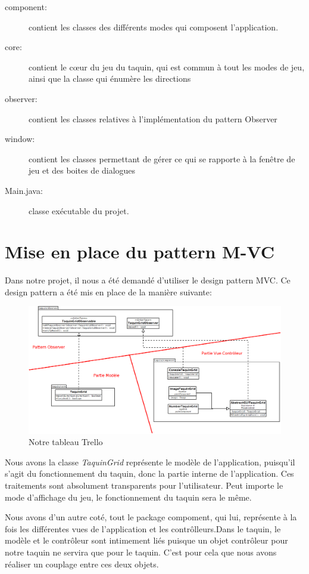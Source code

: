 		\begin{description}
			\item [component:] contient les classes des différents modes qui composent l’application.
			\item [core:] contient le cœur du jeu du taquin, qui est commun à tout les modes de jeu, ainsi que la classe qui énumère les directions
			\item [observer:] contient les classes relatives à l'implémentation du pattern Observer
			\item [window:] contient les classes permettant de gérer ce qui se rapporte à la fenêtre de jeu et des boites de dialogues
			\item [Main.java:] classe exécutable du projet.
		\end{description}

	\section{Mise en place du pattern M-VC}

	Dans notre projet, il nous a été demandé d'utiliser le design pattern MVC. Ce design pattern a été mis en place de la manière suivante:

	\begin{figure}[H]
		\centering\includegraphics[width=1\textwidth, keepaspectratio]{img/diagramMVC.png}
		\caption{Notre tableau Trello}
		\label{Mise en place du M-VC}
	\end{figure}

	Nous avons la classe \textit{TaquinGrid} représente le modèle de l'application, puisqu'il s'agit du fonctionnement du taquin, donc la partie interne de l'application. Ces traitements sont absolument transparents pour l'utilisateur. Peut importe le mode d'affichage du jeu, le fonctionnement du taquin sera le même.

	Nous avons d'un autre coté, tout le package compoment, qui lui, représente à la fois les différentes vues de l'application et les contrôlleurs.Dans le taquin, le modèle et le contrôleur sont intimement liés puisque un objet contrôleur pour notre taquin ne servira que pour le taquin. C'est pour cela que nous avons réaliser un couplage entre ces deux objets.

